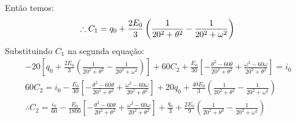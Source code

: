 \documentclass{abntex2}
\begin{document}
\Large Então temos:\\
\begin{equation*}
    \therefore C_1 = q_0 + \frac{2E_0}{3}\left(\frac{1}{20^2 +\theta^2} - \frac{1}{20^2 +\omega^2}\right)\\
\end{equation*}
\Large Substituindo $C_1$ na segunda equação:\\
\begin{eqnarray*}
     -20\left[q_0 + \frac{2E_0}{3}\left(\frac{1}{20^2 +\theta^2} - \frac{1}{20^2 +\omega^2}\right)\right] + 60C_2 + \frac{E_0}{30}\left[-\frac{\theta^2 - {60\theta}}{20^2 +\theta^2} +\frac{\omega^2 - 60\omega}{20^2 +\theta^2}\right] = i_0\\
     60C_2 = i_0 - \frac{E_0}{30}\left[-\frac{\theta^2 - {60\theta}}{20^2 +\theta^2} +\frac{\omega^2 - 60\omega}{20^2 +\theta^2}\right] + 20q_0 + \frac{40E_0}{3}\left(\frac{1}{20^2 +\theta^2} - \frac{1}{20^2 +\omega^2}\right)\\
     \therefore C_2 = \frac{i_0}{60} - \frac{E_0}{1800}\left[-\frac{\theta^2 - {60\theta}}{20^2 +\theta^2} +\frac{\omega^2 - 60\omega}{20^2 +\theta^2}\right] + \frac{q_0}{3} + \frac{2E_0}{9}\left(\frac{1}{20^2 +\theta^2} - \frac{1}{20^2 +\omega^2}\right)\\
\end{eqnarray*}
\end{document}
